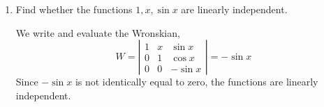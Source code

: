 \begin{enumerate}[label=\color{ocre}\textbf{\arabic*.}]
\begin{answer}
	\begin{align*}
	\intertext{ Writing the equation in standard form, we find that,}
	p(x)&=-2 x /\left(1-x^{2}\right)\\
	 \text{The Wronskian is }\ W(t)&=c \cdot \exp \left(-\int \frac{-2 x}{1-x^{2}} d x\right)\\&=c \cdot \exp \left(-\ln \left|1-x^{2}\right|\right)\\&=c\left|1-x^{2}\right|^{-1}
	 \intertext{where $c$ is some constant.}
	\end{align*}
\end{answer}
\item Find whether the functions $1, x, \sin x$ are linearly independent.
\begin{answer}
	 We write and evaluate the Wronskian,
	 $$
	 W=\left|\begin{array}{rrr}
	 1 & x & \sin x \\
	 0 & 1 & \cos x \\
	 0 & 0 & -\sin x
	 \end{array}\right|=-\sin x
	 $$
	 Since $-\sin x$ is not identically equal to zero, the functions are linearly independent.
	 
\end{answer}

	
\end{enumerate}




